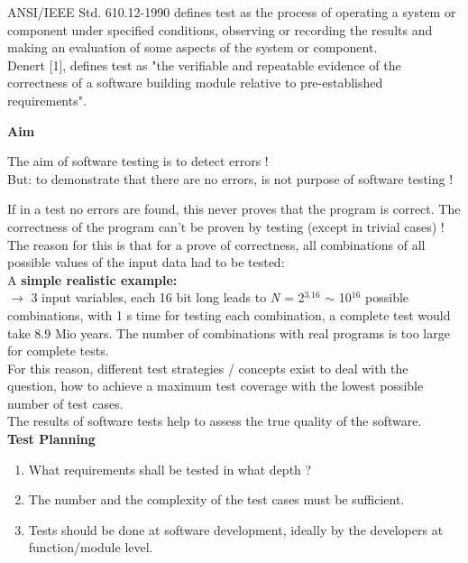 ANSI/IEEE Std. 610.12-1990 defines test as the process of operating a system or component under specified conditions, observing or recording the results and making an evaluation of some aspects of the system or component.\\

Denert [1], defines test as "the verifiable and repeatable evidence of the correctness of a software building module relative to pre-established requirements".\\
\os{\newpage}

{\rot\bf Aim}

\begin{tcolorbox}[colback=blue!5!white,colframe=blue!75!black]
The aim of software testing is to detect errors !\\
But: to demonstrate that there are no errors, is not purpose of software testing !
\end{tcolorbox}

If in a test no errors are found, this never proves that the program is correct. The correctness of the program can't be proven by testing (except in trivial cases) !\\

The reason for this is that for a prove of correctness, all combinations of all possible values of the input data had to be tested: \\

A \textbf{simple realistic example:}\\

$\rightarrow$ 3 input variables, each 16 bit long leads to  \textit{N} = 2${}^{3.16}$ $\mathrm{\sim}$ 10${}^{16}$ possible combinations, with 1 s time for testing each combination, a complete test would take 8.9 Mio years. The number of combinations with real programs is too large for complete tests.\\

For this reason, different test strategies / concepts exist to deal with the question, how to achieve a maximum test coverage with the lowest possible number of test cases. \\

The results of software tests help to assess the true quality of the software.\\

{\rot\bf Test Planning}

\begin{enumerate}
\item  What requirements shall be tested in what depth ? 
\item  The number and the complexity of the test cases must be sufficient.
\item  Tests should be done at software development, ideally by the developers at  function/module level.
\end{enumerate}

